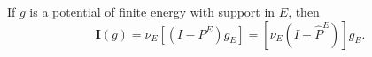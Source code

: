 If $g$ is a potential of finite energy with support in $E$, then
$$\mathbf{I}(g) = \nu_E[(I - P^E)g_E] = [\nu_E(I - \hat{P}^E)]g_E.$$
